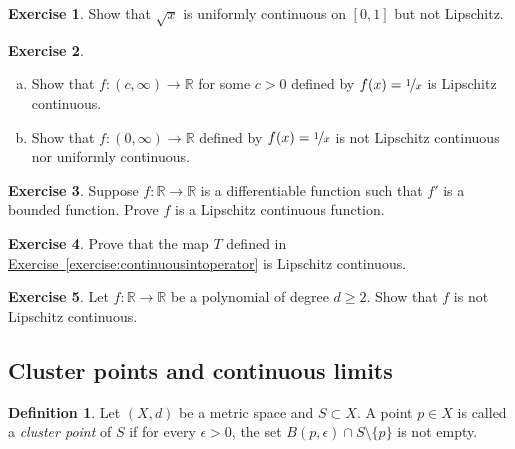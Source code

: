 \documentclass[12pt,openany]{book}
\newcommand{\R}{{\mathbb{R}}}
\theoremstyle{plain}
\theoremstyle{remark}
\theoremstyle{definition}
\newtheorem{defn}[thm]{Definition}
\newenvironment{exbox}{%
    \def\FrameCommand{\vrule width 1pt \relax\hspace{10pt}}%
    \MakeFramed{\advance\hsize-\width\FrameRestore}%
}{%
    \endMakeFramed
}
\newenvironment{exparts}{%
    \leavevmode\begin{enumerate}[a),noitemsep,topsep=0pt,parsep=0pt,partopsep=0pt]
}{%
    \end{enumerate}
}
\theoremstyle{exercise}
\newtheorem{exercise}{Exercise}[section]
\theoremstyle{example}
\newcommand{\exerciseref}[1]{\hyperref[#1]{Exercise~\ref*{#1}}}
\begin{document}
\begin{exbox}
\begin{exercise}
Show that $\sqrt{x}$ is uniformly continuous on $[0,1]$ but not Lipschitz.
\end{exercise}

\begin{exercise}
\begin{exparts}
\item
Show that $f \colon (c,\infty) \to \R$ for some $c > 0$
defined by $f(x) = \nicefrac{1}{x}$ is Lipschitz continuous.
\item
Show that $f \colon (0,\infty) \to \R$
defined by $f(x) = \nicefrac{1}{x}$ is not Lipschitz continuous nor uniformly
continuous.
\end{exparts}
\end{exercise}

\begin{exercise}
Suppose $f \colon \R \to \R$ is a differentiable
function such that $f'$ is a bounded function.  Prove
$f$ is a Lipschitz continuous function.
\end{exercise}

\begin{exercise}
Prove that the map $T$ defined in \exerciseref{exercise:continuousintoperator}
is Lipschitz continuous.
\end{exercise}

\begin{exercise}
Let $f \colon \R \to \R$ be a polynomial of degree 
$d \geq 2$.  Show that $f$ is not Lipschitz
continuous.
\end{exercise}
\end{exbox}

\subsection{Cluster points and continuous limits}

\begin{defn}
Let $(X,d)$ be a metric space and
$S \subset X$. A point $p \in X$ is called
a \emph{cluster point} of $S$
if for every $\epsilon > 0$, the set $B(p,\epsilon) \cap S
\setminus \{ p \}$ is not empty.
\end{defn}
\end{document}
